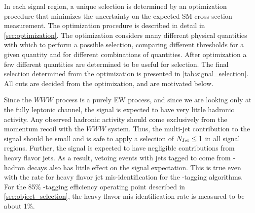 In each signal region, a unique selection is determined by an optimization
procedure that minimizes the uncertainty on the expected SM cross-section
measurement. 
The optimization procedure is described in detail in \sec\ref{sec:optimization}.
The optimization considers many different physical quantities 
with which to perform a possible selection, comparing different
thresholds for a given quantity and for different combinations of 
quantities. After optimization a few different quantities
are determined to be useful for selection. 
The final selection determined from the optimization
is presented in \tab\ref{tab:signal_selection}.
All cuts are decided from the optimization, and are motivated below.






Since the $WWW$ process is a purely EW process, and since
we are looking only at the fully leptonic channel, the 
signal is expected to have very little hadronic 
activity. Any observed hadronic activity should come exclusively
from the momentum recoil with the $WWW$ system.
Thus, the multi-jet contribution to the signal
should be small and is safe to apply a selection of $N_{\textrm{Jet}} \leq 1$
in all signal regions.
Further, the signal is 
expected to have negligible contributions
from heavy flavor jets. As a result, vetoing events with jets
tagged to come from \bee-hadron decays also has
little effect on the signal expectation. This is true even with 
the rate for heavy flavor jet mis-identification for the 
\bee-tagging algorithms. For the 
85\% \bee-tagging efficiency operating point described in 
\sec\ref{sec:object_selection}, the heavy flavor
mis-identification rate is measured to be about 1\%. %


